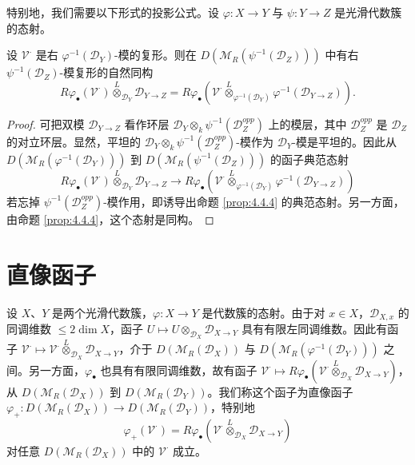 特别地，我们需要以下形式的投影公式。设 $\varphi:X\to Y$ 与 $\psi:Y\to Z$ 是光滑代数簇的态射。

\begin{lemma}\label{lem:4.4.5}
设 $\mathcal{V}^\cdot$ 是右 $\varphi^{-1}(\mathcal{D}_Y)$-模的复形。则在
$D(\mathcal{M}_R(\psi^{-1}(\mathcal{D}_Z)))$ 中有右 $\psi^{-1}(\mathcal{D}_Z)$-模复形的自然同构
$$R\varphi_\bullet(\mathcal{V}^\cdot)\overset{L}{\otimes}_{\mathcal{D}_Y}\mathcal{D}_{Y\to Z}
=R\varphi_\bullet(\mathcal{V}^\cdot\overset{L}{\otimes}_{\varphi^{-1}(\mathcal{D}_Y)}
\varphi^{-1}(\mathcal{D}_{Y\to Z})).$$
\end{lemma}

\begin{proof}
可把双模 $\mathcal{D}_{Y\to Z}$ 看作环层 $\mathcal{D}_Y\otimes_k\psi^{-1}(\mathcal{D}_Z^{opp})$ 上的模层，其中
$\mathcal{D}_Z^{opp}$ 是 $\mathcal{D}_Z$ 的对立环层。显然，平坦的
$\mathcal{D}_Y\otimes_k\psi^{-1}(\mathcal{D}_Z^{opp})$-模作为 $\mathcal{D}_Y$-模是平坦的。因此从
$D(\mathcal{M}_R(\varphi^{-1}(\mathcal{D}_Y)))$ 到 $D(\mathcal{M}_R(\psi^{-1}(\mathcal{D}_Z)))$ 的函子典范态射
$$R\varphi_\bullet(\mathcal{V}^\cdot)\overset{L}{\otimes}_{\mathcal{D}_Y}\mathcal{D}_{Y\to Z}
\longrightarrow R\varphi_\bullet(\mathcal{V}^\cdot\overset{L}{\otimes}_{\varphi^{-1}(\mathcal{D}_Y)}
\varphi^{-1}(\mathcal{D}_{Y\to Z}))$$
若忘掉 $\psi^{-1}(\mathcal{D}_Z^{opp})$-模作用，即诱导出命题 \ref{prop:4.4.4} 的典范态射。另一方面，由命题 \ref{prop:4.4.4}，这个态射是同构。
\end{proof}

\section{直像函子}

设 $X$、$Y$ 是两个光滑代数簇，$\varphi:X\to Y$ 是代数簇的态射。由于对 $x\in X$，$\mathcal{D}_{X,x}$ 的同调维数 $\le 2\dim X$，函子 $U\mapsto U\otimes_{\mathcal{D}_X}\mathcal{D}_{X\to Y}$ 具有有限左同调维数。因此有函子
$\mathcal{V}^\cdot\mapsto\mathcal{V}^\cdot\overset{L}{\otimes}_{\mathcal{D}_X}\mathcal{D}_{X\to Y}$，介于
$D(\mathcal{M}_R(\mathcal{D}_X))$ 与 $D(\mathcal{M}_R(\varphi^{-1}(\mathcal{D}_Y)))$ 之间。另一方面，$\varphi_\bullet$ 也具有有限同调维数，故有函子
$\mathcal{V}^\cdot\mapsto R\varphi_\bullet(\mathcal{V}^\cdot\overset{L}{\otimes}_{\mathcal{D}_X}\mathcal{D}_{X\to Y})$，从
$D(\mathcal{M}_R(\mathcal{D}_X))$ 到 $D(\mathcal{M}_R(\mathcal{D}_Y))$。我们称这个函子为直像函子
$\varphi_+:D(\mathcal{M}_R(\mathcal{D}_X))\to D(\mathcal{M}_R(\mathcal{D}_Y))$，特别地
$$\varphi_+(\mathcal{V}^\cdot)=R\varphi_\bullet(\mathcal{V}^\cdot\overset{L}{\otimes}_{\mathcal{D}_X}\mathcal{D}_{X\to Y})$$
对任意 $D(\mathcal{M}_R(\mathcal{D}_X))$ 中的 $\mathcal{V}^\cdot$ 成立。

